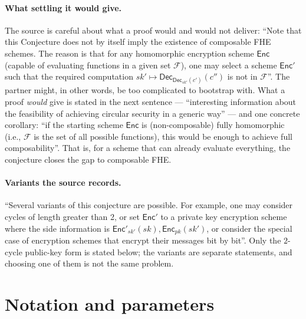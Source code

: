 \documentclass{conjura-conjecture}
\newcommand{\Enc}{\mathsf{Enc}}
\newcommand{\Dec}{\mathsf{Dec}}
\newcommand{\Fset}{\mathcal{F}}
\begin{document}
\paragraph{What settling it would give.}
The source is careful about what a proof would and would not deliver:
``Note that this Conjecture does not by itself imply the existence of
composable FHE schemes. The reason is that for any homomorphic
encryption scheme $\Enc$ (capable of evaluating functions in a given
set $\Fset$), one may select a scheme $\Enc'$ such that the required
computation $sk' \mapsto \Dec_{\Dec_{sk'}(c')}(c'')$ is not in
$\Fset$''. The partner might, in other words, be too complicated to
bootstrap with. What a proof \emph{would} give is stated in the next
sentence --- ``interesting information about the feasibility of
achieving circular security in a generic way'' --- and one concrete
corollary: ``if the starting scheme $\Enc$ is (non-composable) fully
homomorphic (i.e., $\Fset$ is the set of all possible functions), this
would be enough to achieve full composability''. That is, for a scheme
that can already evaluate everything, the conjecture closes the gap to
composable FHE\@.

\paragraph{Variants the source records.}
``Several variants of this conjecture are possible. For example, one
may consider cycles of length greater than 2, or set $\Enc'$ to a
private key encryption scheme where the side information is
$\Enc'_{sk'}(sk), \Enc_{pk}(sk')$, or consider the special case of
encryption schemes that encrypt their messages bit by bit''. Only the
$2$-cycle public-key form is stated below; the variants are separate
statements, and choosing one of them is not the same problem.

\section{Notation and parameters}\label{sec:notation}
\end{document}
